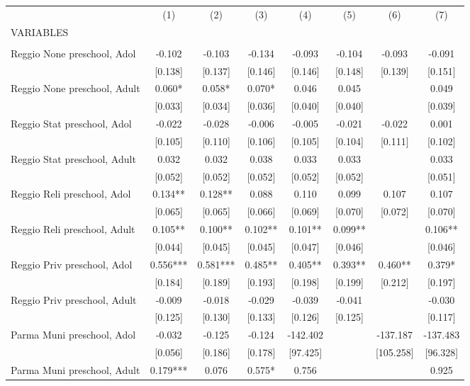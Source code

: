 \begin{tabular}{lccccccc} \hline
 & (1) & (2) & (3) & (4) & (5) & (6) & (7) \\
VARIABLES &  &  &  &  &  &  &  \\ \hline
 &  &  &  &  &  &  &  \\
Reggio None preschool, Adol & -0.102 & -0.103 & -0.134 & -0.093 & -0.104 & -0.093 & -0.091 \\
 & [0.138] & [0.137] & [0.146] & [0.146] & [0.148] & [0.139] & [0.151] \\
Reggio None preschool, Adult & 0.060* & 0.058* & 0.070* & 0.046 & 0.045 &  & 0.049 \\
 & [0.033] & [0.034] & [0.036] & [0.040] & [0.040] &  & [0.039] \\
Reggio Stat preschool, Adol & -0.022 & -0.028 & -0.006 & -0.005 & -0.021 & -0.022 & 0.001 \\
 & [0.105] & [0.110] & [0.106] & [0.105] & [0.104] & [0.111] & [0.102] \\
Reggio Stat preschool, Adult & 0.032 & 0.032 & 0.038 & 0.033 & 0.033 &  & 0.033 \\
 & [0.052] & [0.052] & [0.052] & [0.052] & [0.052] &  & [0.051] \\
Reggio Reli preschool, Adol & 0.134** & 0.128** & 0.088 & 0.110 & 0.099 & 0.107 & 0.107 \\
 & [0.065] & [0.065] & [0.066] & [0.069] & [0.070] & [0.072] & [0.070] \\
Reggio Reli preschool, Adult & 0.105** & 0.100** & 0.102** & 0.101** & 0.099** &  & 0.106** \\
 & [0.044] & [0.045] & [0.045] & [0.047] & [0.046] &  & [0.046] \\
Reggio Priv preschool, Adol & 0.556*** & 0.581*** & 0.485** & 0.405** & 0.393** & 0.460** & 0.379* \\
 & [0.184] & [0.189] & [0.193] & [0.198] & [0.199] & [0.212] & [0.197] \\
Reggio Priv preschool, Adult & -0.009 & -0.018 & -0.029 & -0.039 & -0.041 &  & -0.030 \\
 & [0.125] & [0.130] & [0.133] & [0.126] & [0.125] &  & [0.117] \\
Parma Muni preschool, Adol & -0.032 & -0.125 & -0.124 & -142.402 &  & -137.187 & -137.483 \\
 & [0.056] & [0.186] & [0.178] & [97.425] &  & [105.258] & [96.328] \\
Parma Muni preschool, Adult & 0.179*** & 0.076 & 0.575* & 0.756 &  &  & 0.925 \\

\end{tabular}
